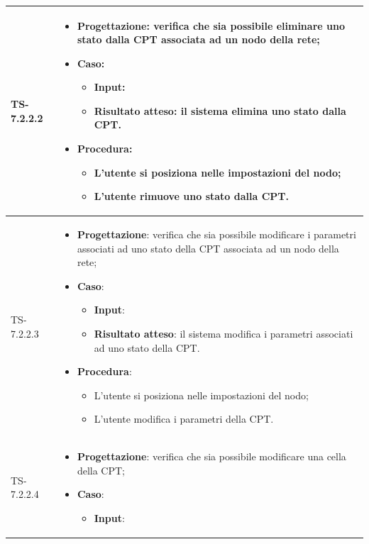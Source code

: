 \begin{longtable}{|C{2.5cm}|C{13cm}|}
	\\
	\hline
	{TS-7.2.2.2} &
\begin{itemize}
	\item \textbf{Progettazione}: verifica che sia possibile eliminare uno
	stato dalla CPT associata ad un nodo della rete;
	\item \textbf{Caso}: 
	\begin{itemize}
		\item \textbf{Input}: 
		\item \textbf{Risultato atteso}: il sistema elimina uno stato dalla CPT.
	\end{itemize}
	\item \textbf{Procedura}:
	\begin{itemize}
		\item L'utente si posiziona nelle impostazioni del nodo;
		\item L'utente rimuove uno stato dalla CPT.
	\end{itemize} 
\end{itemize}
	   \\
	\hline
	{TS-7.2.2.3} & 
\begin{itemize}
	\item \textbf{Progettazione}: verifica che sia possibile modificare i
	parametri associati ad uno stato della CPT associata ad un nodo della rete;
	\item \textbf{Caso}: 
	\begin{itemize}
		\item \textbf{Input}: 
		\item \textbf{Risultato atteso}: il sistema modifica i parametri associati ad uno stato della CPT.
	\end{itemize}
	\item \textbf{Procedura}:
	\begin{itemize}
		\item L'utente si posiziona nelle impostazioni del nodo;
		\item L'utente modifica i parametri della CPT.
	\end{itemize} 
\end{itemize}
	 \\
	\hline
	{TS-7.2.2.4} & 
\begin{itemize}
	\item \textbf{Progettazione}: verifica che sia possibile modificare una
	cella della CPT;
	\item \textbf{Caso}: 
	\begin{itemize}
		\item \textbf{Input}: 

\end{itemize}
\end{itemize}
\end{longtable}
